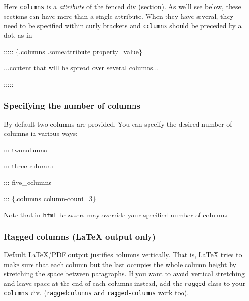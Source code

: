 \documentclass[
]{article}
\newenvironment{Shaded}{}{}
\newcommand{\NormalTok}[1]{#1}
\begin{document}
Here \texttt{columns} is a \emph{attribute} of the fenced div (section).
As we'll see below, these sections can have more than a single
attribute. When they have several, they need to be specified within
curly brackets and \texttt{columns} should be preceded by a dot, as in:

\begin{Shaded}
\begin{Highlighting}[]
\NormalTok{::::: \{.columns .someattribute property=value\}}

\NormalTok{...content that will be spread over several columns...}

\NormalTok{:::::}
\end{Highlighting}
\end{Shaded}

\hypertarget{specifying-the-number-of-columns}{%
\subsubsection{Specifying the number of
columns}\label{specifying-the-number-of-columns}}

By default two columns are provided. You can specify the desired number
of columns in various ways:

\begin{Shaded}
\begin{Highlighting}[]
\NormalTok{::: twocolumns}

\NormalTok{::: three{-}columns}

\NormalTok{::: five\_columns}

\NormalTok{::: \{.columns column{-}count=3\}}
\end{Highlighting}
\end{Shaded}

Note that in \texttt{html} browsers may override your specified number
of columns.

\hypertarget{ragged-columns-latex-output-only}{%
\subsubsection{Ragged columns (LaTeX output
only)}\label{ragged-columns-latex-output-only}}

Default LaTeX/PDF output justifies columns vertically. That is, LaTeX
tries to make sure that each column but the last occupies the whole
column height by stretching the space between paragraphs. If you want to
avoid vertical stretching and leave space at the end of each columns
instead, add the \texttt{ragged} class to your \texttt{columns} div.
(\texttt{raggedcolumns} and \texttt{ragged-columns} work too).
\end{document}
